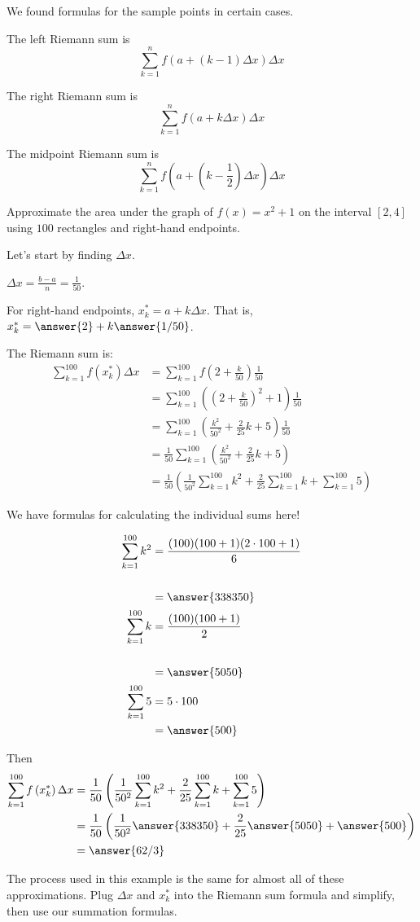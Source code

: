 \documentclass{ximera}
\begin{document}
We found formulas for the sample points in certain cases.

The left Riemann sum is
\[ \sum_{k=1}^n f(a + (k-1)\Delta x) \Delta x \]

The right Riemann sum is
\[ \sum_{k=1}^n f(a + k \Delta x) \Delta x \]

The midpoint Riemann sum is
\[ \sum_{k=1}^n f\left(a + \left(k-\frac{1}{2}\right)\Delta x\right) \Delta x \]
  
  
\begin{example}
	Approximate the area under the graph of $f(x) = x^2+1$ on the interval $[2,4]$ using $100$ rectangles and right-hand endpoints.
	\begin{explanation}
		Let's start by finding $\Delta x$.  
		
		$\Delta x = \frac{b-a}{n} = \frac{1}{50}$.


		For right-hand endpoints, $x_k^* = a + k \Delta x$.  
		That is, $x_k^* = \answer{2} + k \answer{1/50}$.
		
		The Riemann sum is:
		\begin{align*}
			\sum_{k=1}^{100} f\left( x_k^* \right) \Delta x
				&=\sum_{k=1}^{100} f\left( 2 + \frac{k}{50} \right) \frac{1}{50}\\
				&=\sum_{k=1}^{100}\left( \left( 2 + \frac{k}{50} \right)^2+1 \right)\frac{1}{50}\\
				&= \sum_{k=1}^{100} \left( \frac{k^2}{50^2} + \frac{2}{25}k+5\right) \frac{1}{50}\\
				&= \frac{1}{50}\sum_{k=1}^{100} \left( \frac{k^2}{50^2} + \frac{2}{25}k+5\right)\\
				&= \frac{1}{50}\left(\frac{1}{50^2}\sum_{k=1}^{100} k^2 + \frac{2}{25}\sum_{k=1}^{100}k+ \sum_{k=1}^{100}5\right)
		\end{align*}

		We have formulas for calculating the individual sums here!
		
		\begin{align*} 
			\sum_{k=1}^{100} k^2 &= \frac{(100)(100+1)(2\cdot100+1)}{6} \\ \\
				&= \answer{338350}\\
			\sum_{k=1}^{100} k &= \frac{(100)(100+1)}{2} \\ \\
				&= \answer{5050}\\
			\sum_{k=1}^{100} 5 &= 5 \cdot 100 \\
				&= \answer{500}
		\end{align*}
		
		Then
		\begin{align*}
			\sum_{k=1}^{100} f\left( x_k^* \right) \Delta x
				&=\frac{1}{50}\left(\frac{1}{50^2}\sum_{k=1}^{100} k^2 + \frac{2}{25}\sum_{k=1}^{100}k+ \sum_{k=1}^{100}5\right) \\
				&= \frac{1}{50}\left(\frac{1}{50^2}\answer{338350} + \frac{2}{25}\answer{5050}+ \answer{500}\right) \\
				&= \answer{62/3}
		\end{align*}
	\end{explanation}
\end{example}
 
The process used in this example is the same for almost all of these approximations.  Plug $\Delta x$ and $x_k^*$ into the Riemann sum formula and simplify,
then use our summation formulas.
  
\end{document}
